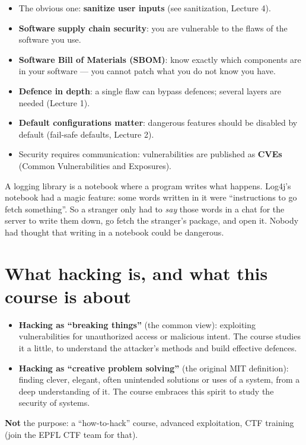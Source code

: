 \begin{propbox}[title=Lessons learned]
\begin{itemize}
  \item The obvious one: \textbf{sanitize user inputs} (see sanitization, Lecture 4).
  \item \textbf{Software supply chain security}: you are vulnerable to the flaws of the software
        you use.
  \item \textbf{Software Bill of Materials (SBOM)}: know exactly which components are in your
        software --- you cannot patch what you do not know you have.
  \item \textbf{Defence in depth}: a single flaw can bypass defences; several layers are needed
        (Lecture 1).
  \item \textbf{Default configurations matter}: dangerous features should be disabled by default
        (fail-safe defaults, Lecture 2).
  \item Security requires communication: vulnerabilities are published as \textbf{CVEs}
        (Common Vulnerabilities and Exposures).
\end{itemize}
\end{propbox}

\begin{goatbox}
A logging library is a notebook where a program writes what happens. Log4j's notebook had a
magic feature: some words written in it were ``instructions to go fetch something''. So a
stranger only had to \emph{say} those words in a chat for the server to write them down, go fetch
the stranger's package, and open it. Nobody had thought that writing in a notebook could be
dangerous.
\end{goatbox}

\section{What hacking is, and what this course is about}

\begin{defnbox}[title=Two views of hacking]
\begin{itemize}
  \item \textbf{Hacking as ``breaking things''} (the common view): exploiting vulnerabilities for
        unauthorized access or malicious intent. The course studies it a little, to understand
        the attacker's methods and build effective defences.
  \item \textbf{Hacking as ``creative problem solving''} (the original MIT definition): finding
        clever, elegant, often unintended solutions or uses of a system, from a deep
        understanding of it. The course embraces this spirit to study the security of systems.
\end{itemize}
\textbf{Not} the purpose: a ``how-to-hack'' course, advanced exploitation, CTF training (join the
EPFL CTF team for that).
\end{defnbox}

